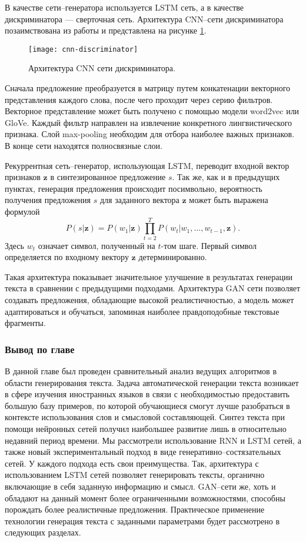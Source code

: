 В качестве сети--генератора используется LSTM сеть, а в качестве дискриминатора --- сверточная сеть. Архитектура CNN--сети дискриминатора позаимствована из работы \cite{zhang2015sensitivity} и представлена на рисунке \ref{fig:cnn-discriminator}.

\begin{figure}[h]
	\centering
	\texttt{[image: cnn-discriminator]}
	\caption{Архитектура CNN сети дискриминатора.}
	\label{fig:cnn-discriminator}
\end{figure}

Сначала предложение преобразуется в матрицу путем конкатенации векторного представления каждого слова, после чего проходит через серию фильтров. Векторное представление может быть получено с помощью модели word2vec\cite{mikolov2013distributed} или GloVe\cite{pennington2014glove}. Каждый фильтр направлен на извлечение конкретного лингвистического признака. Слой max-pooling необходим для отбора наиболее важных признаков. В конце сети находятся полносвязные слои.

Рекуррентная сеть--генератор, использующая LSTM, переводит входной вектор признаков $\mathbf{z}$ в синтезированное предложение $s$. Так же, как и в предыдущих пунктах, генерация предложения происходит посимвольно, вероятность получения предложения $s$ для заданного вектора $\mathbf{z}$ может быть выражена формулой
$$P(s | \mathbf{z}) = P(w_1 | \mathbf{z}) \prod_{t=2}^{T} P(w_t | w_1, \dots, w_{t - 1}, \mathbf{z}).$$
Здесь $w_t$ означает символ, полученный на $t$-том шаге. Первый символ определяется по входному вектору $\mathbf{z}$ детерминированно.

Такая архитектура показывает\cite{zhang2017adversarial} значительное улучшение в результатах генерации текста в сравнении с предыдущими подходами. Архитектура GAN сети позволяет создавать предложения, обладающие высокой реалистичностью, а модель может адаптироваться и обучаться, запоминая наиболее правдоподобные текстовые фрагменты.

\subsubsection{Вывод по главе}
В данной главе был проведен сравнительный анализ ведущих алгоритмов в области генерирования текста. Задача автоматической генерации текста возникает в сфере изучения иностранных языков в связи с необходимостью предоставить большую базу примеров, по которой обучающиеся смогут лучше разобраться в контексте использования слов и смысловой составляющей. Синтез текста при помощи нейронных сетей получил наибольшее развитие лишь в относительно недавний период времени. Мы рассмотрели использование RNN и LSTM сетей, а также новый экспериментальный подход в виде генеративно--состязательных сетей. У каждого подхода есть свои преимущества. Так, архитектура с использованием LSTM сетей позволяет генерировать тексты, органично включающие в себя заданную информацию и смысл. GAN--сети же, хоть и обладают на данный момент более ограниченными возможностями, способны порождать более реалистичные предложения. Практическое применение технологии генерация текста с заданными параметрами будет рассмотрено в следующих разделах.
